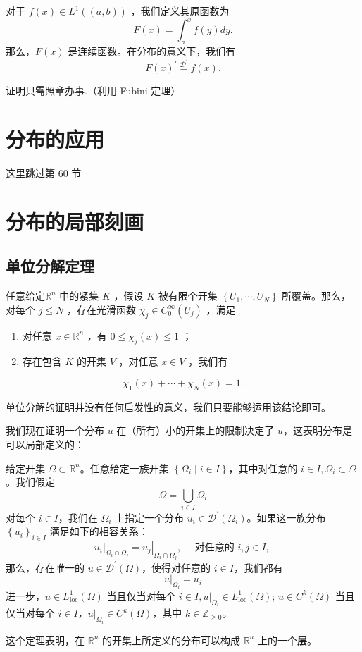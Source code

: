 \begin{lemma}
对于 $f(x) \in L^1((a, b))$ ，我们定义其原函数为
\[
F(x)=\int_a^x f(y) d y .
\]那么，$F(x)$ 是连续函数。在分布的意义下，我们有
\[
F(x)^{\prime} \stackrel{\mathcal{D}^{\prime}}{=} f(x) .
\]
\end{lemma}
证明只需照章办事.（利用 Fubini 定理）

\section{分布的应用}

这里跳过第 60 节

\section{分布的局部刻画}

\subsection{单位分解定理}

\begin{theorem}[单位分解]
任意给定$\mathbb{R}^n$ 中的紧集 $K$ ，假设 $K$ 被有限个开集 $\left\{U_1, \cdots, U_N\right\}$ 所覆盖。那么，对每个 $j \leqslant N$ ，存在光滑函数 $\chi_j \in C_0^{\infty}\left(U_j\right)$ ，满足
	\begin{enumerate}
		\item 对任意 $x \in \mathbb{R}^n$ ，有 $0 \leqslant \chi_j(x) \leqslant 1$ ；
		\item 存在包含 $K$ 的开集 $V$ ，对任意 $x \in V$ ，我们有
	\end{enumerate}
\[
\chi_1(x)+\cdots+\chi_N(x)=1 .
\]
\end{theorem}
\begin{note}
单位分解的证明并没有任何启发性的意义，我们只要能够运用该结论即可。
\end{note}
我们现在证明一个分布 $u$ 在（所有）小的开集上的限制决定了 $u$，这表明分布是可以局部定义的：

\begin{theorem}
给定开集 $\Omega \subset \mathbb{R}^n$。任意给定一族开集 $\left\{\Omega_i \mid i \in I\right\}$，其中对任意的 $i \in I, \Omega_i \subset \Omega$。我们假定
\[
\Omega=\bigcup_{i \in I} \Omega_i
\]对每个 $i \in I$，我们在 $\Omega_i$ 上指定一个分布 $u_i \in \mathcal{D}^{\prime}\left(\Omega_i\right)$。如果这一族分布 $\left\{u_i\right\}_{i \in I}$ 满足如下的相容关系：
\[
\left.u_i\right|_{\Omega_i \cap \Omega_j}=\left.u_j\right|_{\Omega_i \cap \Omega_j}, \quad \text { 对任意的 } i, j \in I \text {, }
\]那么，存在唯一的 $u \in \mathcal{D}^{\prime}(\Omega)$，使得对任意的 $i \in I$，我们都有
\[
\left.u\right|_{\Omega_i}=u_i
\]进一步，$u \in L_{\mathrm{loc}}^1(\Omega)$ 当且仅当对每个 $i \in I,\left. u\right|_{\Omega_i} \in L_{\mathrm{loc}}^1 (\Omega)$; $u \in C^k(\Omega)$ 当且仅当对每个 $i \in I$，$\left.u\right|_{\Omega_i} \in C^k(\Omega)$，其中 $k \in \mathbb{Z}_{\geqslant 0}$。
\end{theorem}
\begin{note}
这个定理表明，在 $\mathbb{R}^n$ 的开集上所定义的分布可以构成 $\mathbb{R}^n$ 上的一个\textbf{层}。
\end{note}
